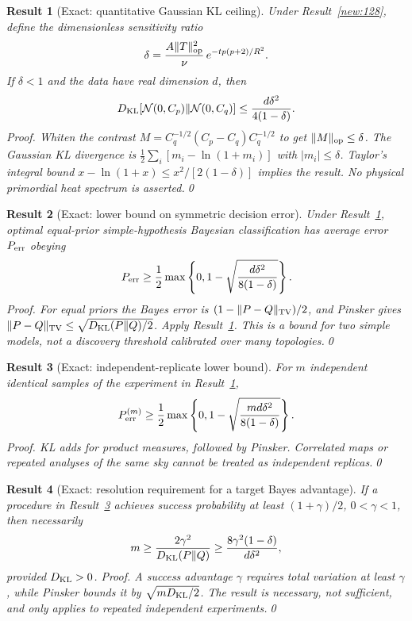 \documentclass[aps,prd,onecolumn,notitlepage,groupedaddress,11pt]{revtex4-2}
\newtheorem{result}{Result}
\begin{document}
\begin{result}[\textsf{Exact}: quantitative Gaussian KL ceiling]\label{new:129}
Under Result~\ref{new:128}, define the dimensionless sensitivity ratio\begin{equation*}\delta=\frac{A\|T\|_{\rm op}^2}{\nu}\,e^{-tp(p+2)/R^2}.\end{equation*} If $\delta<1$ and the data have real dimension $d$, then
\begin{equation}\label{new:eq129}
D_{\rm KL}[\mathcal N(0,C_p)\Vert\mathcal N(0,C_q)]\le\frac{d\delta^2}{4(1-\delta)}.
\end{equation}
\textit{Proof.} Whiten the contrast $M=C_q^{-1/2}(C_p-C_q)C_q^{-1/2}$ to get $\|M\|_{\rm op}\le\delta$. The Gaussian KL divergence is $\frac12\sum_i[m_i-\ln(1+m_i)]$ with $|m_i|\le\delta$. Taylor's integral bound $x-\ln(1+x)\le x^2/[2(1-\delta)]$ implies the result. No physical primordial heat spectrum is asserted.\qed
\end{result}
\begin{result}[\textsf{Exact}: lower bound on symmetric decision error]\label{new:130}
Under Result~\ref{new:129}, optimal equal-prior simple-hypothesis Bayesian classification has average error $P_{\rm err}$ obeying
\begin{equation}\label{new:eq130}
P_{\rm err}\ge\frac12\max\left\{0,1-\sqrt{\frac{d\delta^2}{8(1-\delta)}}\right\}.
\end{equation}
\textit{Proof.} For equal priors the Bayes error is $(1-\|P-Q\|_{\rm TV})/2$, and Pinsker gives $\|P-Q\|_{\rm TV}\le\sqrt{D_{\rm KL}(P\Vert Q)/2}$. Apply Result~\ref{new:129}. This is a bound for two simple models, not a discovery threshold calibrated over many topologies.\qed
\end{result}
\begin{result}[\textsf{Exact}: independent-replicate lower bound]\label{new:131}
For $m$ independent identical samples of the experiment in Result~\ref{new:129},
\begin{equation}\label{new:eq131}
P_{\rm err}^{(m)}\ge\frac12\max\left\{0,1-\sqrt{\frac{md\delta^2}{8(1-\delta)}}\right\}.
\end{equation}
\textit{Proof.} KL adds for product measures, followed by Pinsker. Correlated maps or repeated analyses of the same sky cannot be treated as independent replicas.\qed
\end{result}
\begin{result}[\textsf{Exact}: resolution requirement for a target Bayes advantage]\label{new:132}
If a procedure in Result~\ref{new:131} achieves success probability at least $(1+\gamma)/2$, $0<\gamma<1$, then necessarily
\begin{equation}\label{new:eq132}
m\ge\frac{2\gamma^2}{D_{\rm KL}(P\Vert Q)}\ge\frac{8\gamma^2(1-\delta)}{d\delta^2},
\end{equation}
provided $D_{\rm KL}>0$. \textit{Proof.} A success advantage $\gamma$ requires total variation at least $\gamma$, while Pinsker bounds it by $\sqrt{mD_{\rm KL}/2}$. The result is necessary, not sufficient, and only applies to repeated independent experiments.\qed
\end{result}
\end{document}
